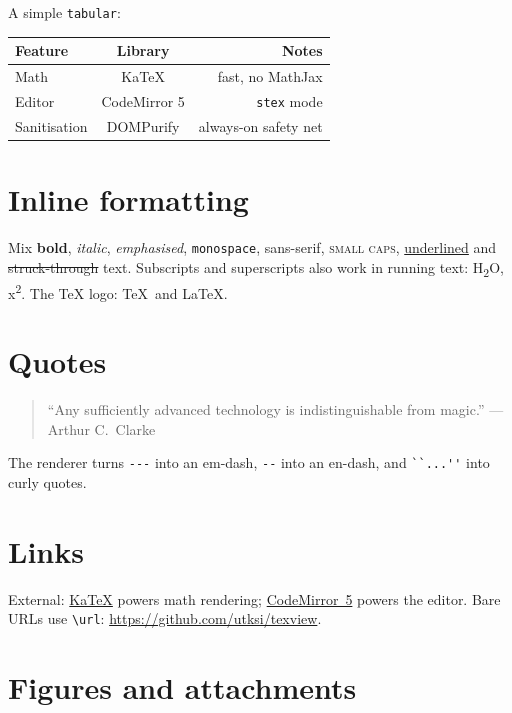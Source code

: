 \documentclass{article}
\begin{document}
A simple \texttt{tabular}:

\begin{center}
\begin{tabular}{l c r}
  \hline
  Feature       & Library      & Notes                     \\
  \hline
  Math          & KaTeX        & fast, no MathJax          \\
  Editor        & CodeMirror 5 & \texttt{stex} mode        \\
  Sanitisation  & DOMPurify    & always-on safety net      \\
  \hline
\end{tabular}
\end{center}

\section{Inline formatting}

Mix \textbf{bold}, \textit{italic}, \emph{emphasised}, \texttt{monospace},
\textsf{sans-serif}, \textsc{small caps}, \underline{underlined} and
\sout{struck-through} text. Subscripts and superscripts also work in
running text: H\textsubscript{2}O, x\textsuperscript{2}. The TeX logo:
\TeX\ and \LaTeX.

\section{Quotes}

\begin{quote}
``Any sufficiently advanced technology is indistinguishable from magic.''
--- Arthur C.\ Clarke
\end{quote}

The renderer turns \verb|---| into an em-dash, \verb|--| into an
en-dash, and \verb|``...''| into curly quotes.

\section{Links}

External: \href{https://katex.org/}{KaTeX} powers math rendering;
\href{https://codemirror.net/5/}{CodeMirror~5} powers the editor.
Bare URLs use \texttt{\textbackslash url}:
\url{https://github.com/utksi/texview}.

\section{Figures and attachments}
\end{document}
